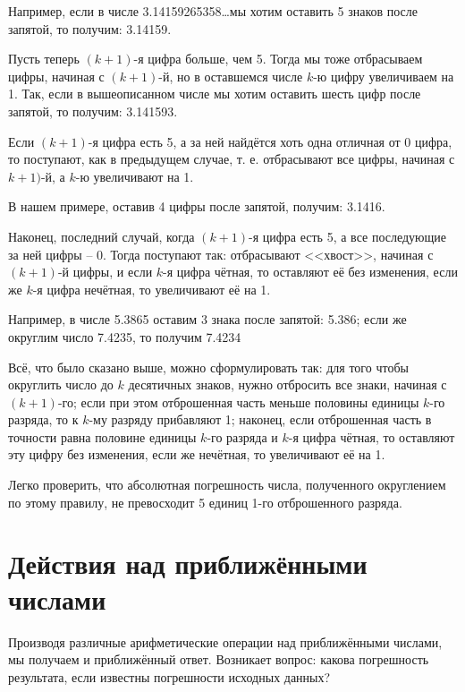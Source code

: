 Например, если в числе 3.14159265358\ldots мы хотим оставить 5 знаков после
запятой, то получим: 3.14159.

Пусть теперь $(k + 1)$-я цифра больше, чем 5. Тогда мы тоже отбрасываем цифры,
начиная с $(k + 1)$-й, но в оставшемся числе $k$-ю цифру увеличиваем на 1.
Так, если в вышеописанном числе мы хотим оставить шесть цифр после запятой, то
получим: 3.141593.

Если $(k + 1)$-я цифра есть 5, а за ней найдётся хоть одна отличная от 0 цифра,
то поступают, как в предыдущем случае, т. е. отбрасывают все цифры, начиная с $k
+ 1)$-й, а $k$-ю увеличивают на 1.

В нашем примере, оставив 4 цифры после запятой, получим: 3.1416.

Наконец, последний случай, когда $(k + 1)$-я цифра есть 5, а все последующие за
ней цифры -- 0. Тогда поступают так: отбрасывают <<хвост>>, начиная с
$(k + 1)$-й цифры, и если $k$-я цифра чётная, то оставляют её без изменения,
если же $k$-я цифра нечётная, то увеличивают её на 1.

Например, в числе 5.3865 оставим 3 знака после запятой: 5.386; если же округлим
число 7.4235, то получим 7.4234

Всё, что было сказано выше, можно сформулировать так: для того чтобы округлить
число до $k$ десятичных знаков, нужно отбросить все знаки, начиная с $(k +
1)$-го; если при этом отброшенная часть меньше половины единицы $k$-го разряда,
то к $k$-му разряду прибавляют 1; наконец, если отброшенная часть в точности
равна половине единицы $k$-го разряда и $k$-я цифра чётная, то оставляют эту
цифру без изменения, если же нечётная, то увеличивают её на 1.

Легко проверить, что абсолютная погрешность числа, полученного округлением по
этому правилу, не превосходит 5 единиц 1-го отброшенного разряда.

\section{Действия над приближёнными числами}
Производя различные арифметические операции над приближёнными числами, мы
получаем и приближённый ответ. Возникает вопрос: какова погрешность результата,
если известны погрешности исходных данных?
